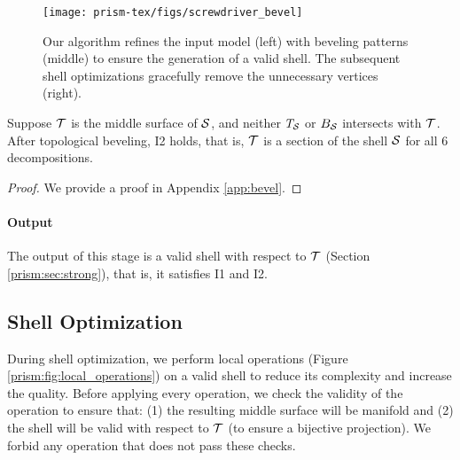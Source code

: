 \begin{figure}
    \texttt{[image: prism-tex/figs/screwdriver\_bevel]}
    \caption{Our algorithm refines the input model (left) with beveling patterns (middle) to ensure the generation of a valid shell. The subsequent shell optimizations gracefully remove the unnecessary vertices (right).}
    \label{prism:fig:beveled_example}
    
\end{figure}

\begin{theorem}
\label{thm:bevel}
Suppose $\T$ is the middle surface of $\S$, and neither $T_\S$ or $B_\S$ intersects with $\T$. After topological beveling, I2 holds, that is, $\T$ is a section of the shell $\S$ for all 6 decompositions.
\end{theorem}
\begin{proof}
We provide a proof in Appendix \ref{app:bevel}.
\end{proof}


\paragraph{Output}
The output of this stage is a valid shell with respect to $\T$ (Section \ref{prism:sec:strong}), that is, it satisfies I1 and I2.


\subsection{Shell Optimization}
\label{prism:sec:optimization}

During shell optimization, we perform local operations
(Figure \ref{prism:fig:local_operations})
on a valid shell to reduce its complexity and increase the quality. Before applying every operation, we check the validity of the operation to ensure that: (1) the resulting middle surface will be manifold \cite{dey1999topology} and (2) the shell will be valid with respect to $\T$ (to ensure a bijective projection). We forbid any operation that does not pass these checks.  

